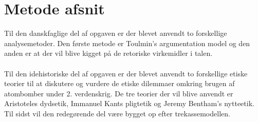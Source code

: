 \section{Metode afsnit}\label{sec:Metode}
Til den danskfaglige del af opgaven er der blevet anvendt to forskellige analysemetoder. Den første metode er Toulmin's argumentation model og den anden er at der vil blive kigget på de retoriske virkemidler i talen.\\ \\
Til den idehistoriske del af opgaven er der blevet anvendt to forskellige etiske teorier til at diskutere og vurdere de etiske dilemmaer omkring brugen af atombomber under 2. verdenskrig. De tre teorier der vil blive anvendt er Aristoteles dydsetik, Immanuel Kants pligtetik og Jeremy Bentham's nytteetik. Til sidst vil den redegørende del være bygget op efter trekassemodellen. 
\newpage